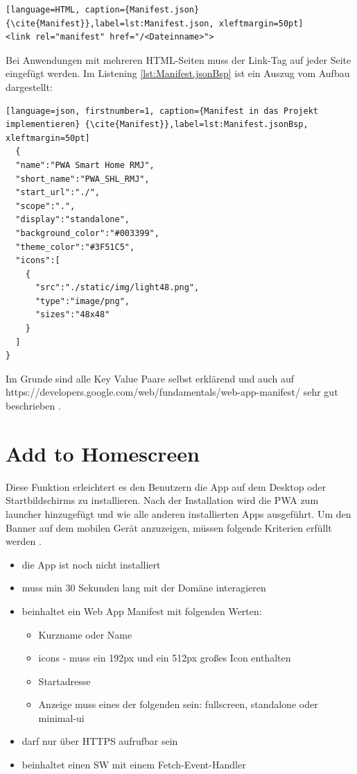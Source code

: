 \begin{lstlisting}[language=HTML, caption={Manifest.json} {\cite{Manifest}},label=lst:Manifest.json, xleftmargin=50pt]
<link rel="manifest" href="/<Dateinname>">
\end{lstlisting}

Bei Anwendungen mit mehreren \acs{HTML}-Seiten muss der Link-Tag auf jeder Seite eingefügt werden. 
Im Listening \ref{lst:Manifest.jsonBsp} ist ein Auszug vom Aufbau dargestellt:
	\begin{lstlisting}[language=json, firstnumber=1, caption={Manifest in das Projekt implementieren} {\cite{Manifest}},label=lst:Manifest.jsonBsp, xleftmargin=50pt]
  {
  "name":"PWA Smart Home RMJ",
  "short_name":"PWA_SHL_RMJ",
  "start_url":"./",
  "scope":".",
  "display":"standalone",
  "background_color":"#003399",
  "theme_color":"#3F51C5",
  "icons":[
    {
      "src":"./static/img/light48.png",
      "type":"image/png",
      "sizes":"48x48"
    }
  ]
}

\end{lstlisting}

Im Grunde sind alle Key Value Paare selbst erklärend und auch auf https://developers.google.com/web/fundamentals/web-app-manifest/ sehr gut beschrieben \cite{Manifest}. 

\section{Add to Homescreen}\label{sub:AddtoHomescreen}
Diese Funktion erleichtert es den Benutzern die App auf dem Desktop oder Startbildschirms zu installieren. Nach der Installation wird die PWA zum launcher hinzugefügt und wie alle anderen installierten Apps ausgeführt.
Um den Banner auf dem mobilen Gerät anzuzeigen, müssen folgende Kriterien erfüllt werden \cite{AddToHomescreen}.


\begin{itemize}
    \item  die App ist noch nicht installiert
	\item  muss min 30 Sekunden lang mit der Domäne interagieren
	\item  beinhaltet ein Web App Manifest mit folgenden Werten:
		 \begin{itemize}
         \item Kurzname oder Name
         \item icons - muss ein 192px und ein 512px großes Icon enthalten
         \item Startadresse
         \item Anzeige muss eines der folgenden sein: fullscreen, standalone oder \\ minimal-ui
      	\end{itemize}
    \item 	darf nur über HTTPS aufrufbar sein
    \item beinhaltet einen \acl{SW} mit einem Fetch-Event-Handler  
\end{itemize}

